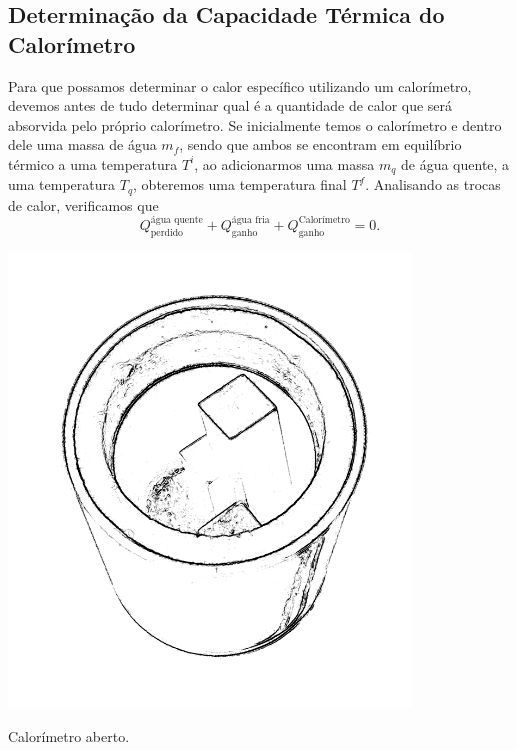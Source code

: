 
\subsection{Determinação da Capacidade Térmica do Calorímetro}

Para que possamos determinar o calor específico utilizando um calorímetro, devemos antes de tudo determinar qual é a quantidade de calor que será absorvida pelo próprio calorímetro. Se inicialmente temos o calorímetro e dentro dele uma massa de água $m_f$, sendo que ambos se encontram em equilíbrio térmico a uma temperatura $T^i$, ao adicionarmos uma massa $m_q$ de água quente, a uma temperatura $T_q$, obteremos uma temperatura final $T^f$. Analisando as trocas de calor, verificamos que
\begin{equation}
	Q^{\textrm{água quente}}_{\textrm{perdido}} + Q^{\textrm{água fria}}_{\textrm{ganho}} + Q^{\textrm{Calorímetro}}_{\textrm{ganho}} = 0.
\end{equation}
%
\begin{marginfigure}
	\centering
	\includegraphics[width=0.8\textwidth]{Ilustrations/Calorimetro.png}
	\caption{Calorímetro aberto.}
\end{marginfigure}
